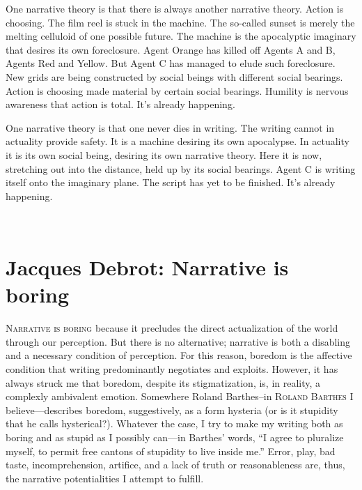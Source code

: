 \documentclass[
]{memoir}
\begin{document}
One narrative theory is that there is always another narrative theory.
Action is choosing. The film reel is stuck in the machine. The so-called
sunset is merely the melting celluloid of one possible future. The
machine is the apocalyptic imaginary that desires its own foreclosure.
Agent Orange has killed off Agents A and B, Agents Red and Yellow. But
Agent C has managed to elude such foreclosure. New grids are being
constructed by social beings with different social bearings. Action is
choosing made material by certain social bearings. Humility is nervous
awareness that action is total. It's already happening.

One narrative theory is that one never dies in writing. The writing
cannot in actuality provide safety. It is a machine desiring its own
apocalypse. In actuality it is its own social being, desiring its own
narrative theory. Here it is now, stretching out into the distance, held
up by its social bearings. Agent C is writing itself onto the imaginary
plane. The script has yet to be finished. It's already happening.

~

\hypertarget{jacques-debrot-narrative-is-boring}{%
\chapter{Jacques Debrot: Narrative is
boring}\label{jacques-debrot-narrative-is-boring}}

\lettrine[lines=3, findent=0em, nindent=0.1em, lhang=0]{N}{arrative is boring}
because it precludes the direct actualization of the world through our
perception. But there is no alternative; narrative is both a disabling
and a necessary condition of perception. For this reason, boredom is the
affective condition that writing predominantly negotiates and exploits.
However, it has always struck me that boredom, despite its
stigmatization, is, in reality, a complexly ambivalent emotion.
Somewhere Roland Barthes--in \textsc{Roland Barthes} I
believe---describes boredom, suggestively, as a form hysteria (or is it
stupidity that he calls hysterical?). Whatever the case, I try to make
my writing both as boring and as stupid as I possibly can---in Barthes'
words, ``I agree to pluralize myself, to permit free cantons of
stupidity to live inside me.'' Error, play, bad taste, incomprehension,
artifice, and a lack of truth or reasonableness are, thus, the narrative
potentialities I attempt to fulfill.
\end{document}
